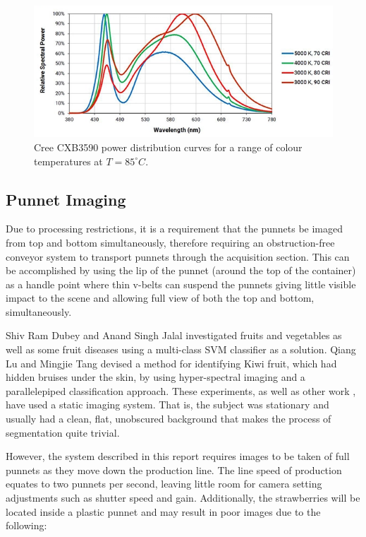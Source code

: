 \documentclass[fleqn,twoside,12pt]{report}
\begin{document}
\begin{figure}[h]
	\centering
	\includegraphics[width=.9\linewidth]{LED_response.png}
	\caption{Cree CXB3590 power distribution curves for a range of colour temperatures at $T=85^{\circ}C$.}
	\label{fig:LED_response}
\end{figure}%





\subsection{Punnet Imaging}

Due to processing restrictions, it is a requirement that the punnets be imaged from top and bottom simultaneously, therefore requiring an obstruction-free conveyor system to transport punnets through the acquisition section. This can be accomplished by using the lip of the punnet (around the top of the container) as a handle point where thin v-belts can suspend the punnets giving little visible impact to the scene and allowing full view of both the top and bottom, simultaneously.

Shiv Ram Dubey and Anand Singh Jalal \cite{shiv} investigated fruits and vegetables as well as some fruit diseases using a multi-class SVM classifier as a solution. Qiang Lu and Mingjie Tang \cite{lu} devised a method for identifying Kiwi fruit, which had hidden bruises under the skin, by using hyper-spectral imaging and a parallelepiped classification approach. These experiments, as well as other work \cite{elmasry2,chiu}, have used a static imaging system. That is, the subject was stationary and usually had a clean, flat, unobscured background that makes the process of segmentation quite trivial. 

However, the system described in this report requires images to be taken of full punnets as they move down the production line. The line speed of production equates to two punnets per second, leaving little room for camera setting adjustments such as shutter speed and gain. Additionally, the strawberries will be located inside a plastic punnet and may result in poor images due to the following:  
\end{document}
